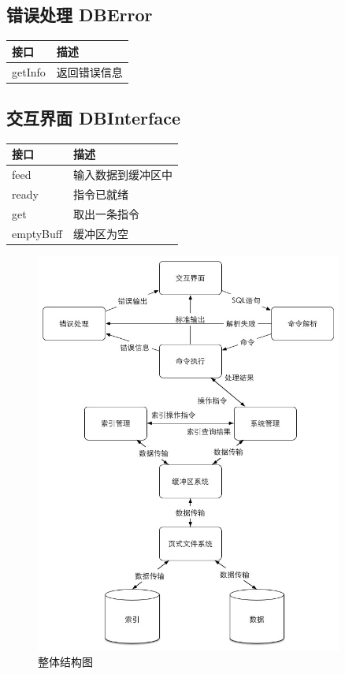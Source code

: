     \subsection{错误处理 DBError}
        \begin{tabularx}{\textwidth}{lX}
            \toprule
            接口 & 描述 \\
            \midrule
            getInfo & 返回错误信息 \\
            \bottomrule
        \end{tabularx}

    \subsection{交互界面 DBInterface}
        \begin{tabularx}{\textwidth}{lX}
            \toprule
            接口 & 描述 \\
            \midrule
            feed & 输入数据到缓冲区中 \\
            \midrule
            ready & 指令已就绪 \\
            \midrule
            get & 取出一条指令 \\
            \midrule
            emptyBuff & 缓冲区为空 \\
            \bottomrule
        \end{tabularx}

    \begin{figure}[!hbp]
        \centering
        \caption{整体结构图}
        \includegraphics[width=0.9\textwidth]{chart/oursql.jpg}
    \end{figure}



